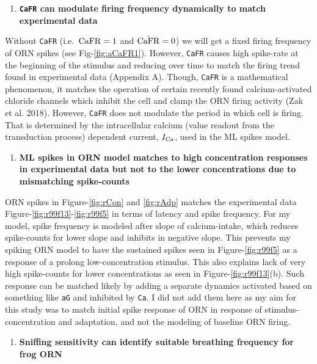 \documentclass[
]{article}
\providecommand{\tightlist}{%
  \setlength{\itemsep}{0pt}\setlength{\parskip}{0pt}}
\begin{document}
\begin{enumerate}
\def\labelenumi{\Alph{enumi}.}
\setcounter{enumi}{3}
\tightlist
\item
  \textbf{\texttt{CaFR} can modulate firing frequency dynamically to match experimental data}
\end{enumerate}

Without \texttt{CaFR} (i.e.~\({\rm CaFR}=1\) and \(\dot{\rm CaFR}=0\)) we will get a fixed firing frequency of ORN spikes (see Fig-\ref{fig:aCaFR1}). However, \texttt{CaFR} causes high spike-rate at the beginning of the stimulus and reducing over time to match the firing trend found in experimental data (Appendix A). Though, \texttt{CaFR} is a mathematical phenomenon, it matches the operation of certain recently found calcium-activated chloride channels which inhibit the cell and clamp the ORN firing activity (Zak et al. 2018). However, \texttt{CaFR} does not modulate the period in which cell is firing. That is determined by the intracellular calcium (value readout from the transduction process) dependent current, \(I_{\rm Ca}\), used in the ML spikes model.

\begin{enumerate}
\def\labelenumi{\Alph{enumi}.}
\setcounter{enumi}{4}
\tightlist
\item
  \textbf{ML spikes in ORN model matches to high concentration responses in experimental data but not to the lower concentrations due to mismatching spike-counts}
\end{enumerate}

ORN spikes in Figure-\ref{fig:rCon} and \ref{fig:rAdp} matches the experimental data Figure-\ref{fig:r99f13}-\ref{fig:r99f5} in terms of latency and spike frequency. For my model, spike frequency is modeled after slope of calcium-intake, which reduces spike-counts for lower slope and inhibits in negative slope. This prevents my spiking ORN model to have the sustained spikes seen in Figure-\ref{fig:r99f5} as a response of a prolong low-concentration stimulus. This also explains lack of very high spike-counts for lower concentrations as seen in Figure-\ref{fig:r99f13}(b). Such response can be matched likely by adding a separate dynamics activated based on something like \texttt{aG} and inhibited by \texttt{Ca}. I did not add them here as my aim for this study was to match initial spike response of ORN in response of stimulus-concentration and adaptation, and not the modeling of baseline ORN firing.

\begin{enumerate}
\def\labelenumi{\Alph{enumi}.}
\setcounter{enumi}{5}
\tightlist
\item
  \textbf{Sniffing sensitivity can identify suitable breathing frequency for frog ORN}
\end{enumerate}
\end{document}
